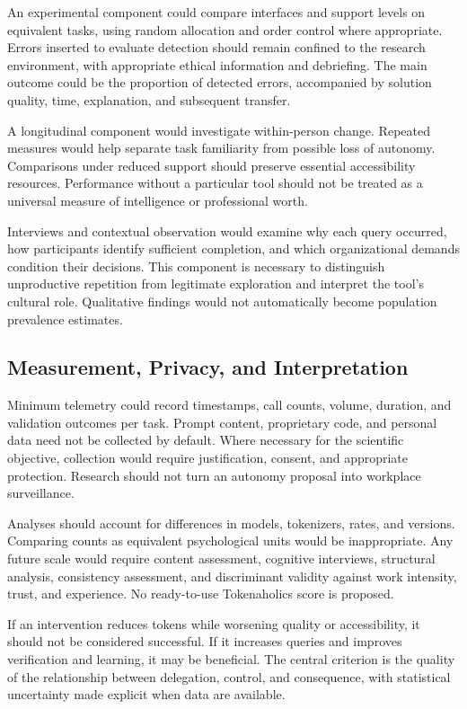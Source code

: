 \documentclass[11pt,a4paper]{article}
\begin{document}
An experimental component could compare interfaces and support levels on equivalent tasks, using random allocation and order control where appropriate. Errors inserted to evaluate detection should remain confined to the research environment, with appropriate ethical information and debriefing. The main outcome could be the proportion of detected errors, accompanied by solution quality, time, explanation, and subsequent transfer.

A longitudinal component would investigate within-person change. Repeated measures would help separate task familiarity from possible loss of autonomy. Comparisons under reduced support should preserve essential accessibility resources. Performance without a particular tool should not be treated as a universal measure of intelligence or professional worth.

Interviews and contextual observation would examine why each query occurred, how participants identify sufficient completion, and which organizational demands condition their decisions. This component is necessary to distinguish unproductive repetition from legitimate exploration and interpret the tool's cultural role. Qualitative findings would not automatically become population prevalence estimates.

\subsection{Measurement, Privacy, and Interpretation}
Minimum telemetry could record timestamps, call counts, volume, duration, and validation outcomes per task. Prompt content, proprietary code, and personal data need not be collected by default. Where necessary for the scientific objective, collection would require justification, consent, and appropriate protection. Research should not turn an autonomy proposal into workplace surveillance.

Analyses should account for differences in models, tokenizers, rates, and versions. Comparing counts as equivalent psychological units would be inappropriate. Any future scale would require content assessment, cognitive interviews, structural analysis, consistency assessment, and discriminant validity against work intensity, trust, and experience. No ready-to-use Tokenaholics score is proposed.

If an intervention reduces tokens while worsening quality or accessibility, it should not be considered successful. If it increases queries and improves verification and learning, it may be beneficial. The central criterion is the quality of the relationship between delegation, control, and consequence, with statistical uncertainty made explicit when data are available.
\end{document}
